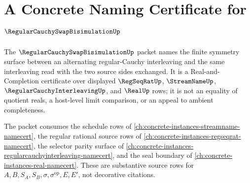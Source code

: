 \chapter{A Concrete Naming Certificate for $\RegularCauchySwapBisimulationUp$}
\label{ch:concrete-instances-regularcauchyswapbisimulation-namecert}

The $\RegularCauchySwapBisimulationUp$ packet names the finite symmetry surface between an alternating regular-Cauchy interleaving and the same interleaving read with the two source sides exchanged. It is a Real-and-Completion certificate over displayed $\RegSeqRatUp$, $\StreamNameUp$, $\RegularCauchyInterleavingUp$, and $\RealUp$ rows; it is not an equality of quotient reals, a host-level limit comparison, or an appeal to ambient completeness.

The packet consumes the schedule rows of \autoref{ch:concrete-instances-streamname-namecert}, the regular rational source rows of \autoref{ch:concrete-instances-regseqrat-namecert}, the selector parity surface of \autoref{ch:concrete-instances-regularcauchyinterleaving-namecert}, and the seal boundary of \autoref{ch:concrete-instances-real-namecert}. These are substantive source rows for $A,B,S_A,S_B,\sigma,\sigma^{\mathrm{op}},E,E'$, not decorative citations.

